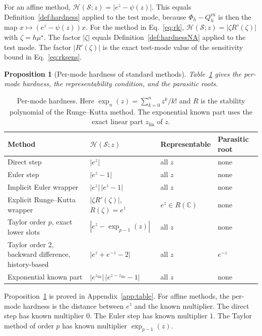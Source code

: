 \documentclass[11pt]{article}
\newtheorem{proposition}{Proposition}
\theoremstyle{definition}
\theoremstyle{remark}
\newcommand{\C}{\mathbb{C}}
\newcommand{\Meth}{\mathcal{S}}          %
\newcommand{\Hard}{\mathcal{H}}          %
\newcommand{\expt}[1]{\exp_{#1}}         %
\newcommand{\ex}{\mathrm{ex}}
\begin{document}
For an affine method, $\Hard(\Meth; z) = |e^z - \psi(z)|$.
This equals Definition~\ref{def:hardness} applied to the test mode, because $\Phi_h - Q^\ex_h$ is then the map $x \mapsto (e^z - \psi(z))x$.
For the method in Eq.~\eqref{eq:rk}, $\Hard(\Meth; z) = |\zeta R'(\zeta)|$ with $\zeta = h\mu^\star$.
The factor $|\zeta|$ equals Definition~\ref{def:hardnessNA} applied to the test mode.
The factor $|R'(\zeta)|$ is the exact test-mode value of the sensitivity bound in Eq.~\eqref{eq:rksens}.

\begin{proposition}[Per-mode hardness of standard methods]\label{prop:table}
Table~\ref{tab:permode} gives the per-mode hardness, the representability condition, and the parasitic roots.
\end{proposition}

\begin{table}[htbp]
\centering
\caption{Per-mode hardness. Here $\expt{n}(z) = \sum_{k=0}^n z^k/k!$ and $R$ is the stability polynomial of the Runge--Kutta method. The exponential known part uses the exact linear part $z_{\mathrm{lin}}$ of $z$.}\label{tab:permode}
\small
\begin{tabular}{@{}p{}p{}p{}p{}@{}}
\toprule
Method & $\Hard(\Meth; z)$ & Representable & Parasitic root \\
\midrule
Direct step & $|e^{z}|$ & all $z$ & none \\
Euler step & $|e^z - 1|$ & all $z$ & none \\
Implicit Euler wrapper & $|e^z|\,|e^z - 1|$ & all $z$ & none \\
Explicit Runge--Kutta wrapper & $|\zeta R'(\zeta)|$, $R(\zeta) = e^z$ & $e^z \in R(\C)$ & none \\
Taylor order $p$, exact lower slots & $|e^z - \expt{p-1}(z)|$ & all $z$ & none \\
Taylor order 2, backward difference, history-based & $|e^z + e^{-z} - 2|$ & all $z$ & $e^{-z}$ \\
Exponential known part & $|e^{z_{\mathrm{lin}}}|\,|e^{z - z_{\mathrm{lin}}} - 1|$ & all $z$ & none \\
\bottomrule
\end{tabular}
\end{table}

Proposition~\ref{prop:table} is proved in Appendix~\ref{app:table}.
For affine methods, the per-mode hardness is the distance between $e^z$ and the known multiplier.
The direct step has known multiplier $0$.
The Euler step has known multiplier $1$.
The Taylor method of order $p$ has known multiplier $\expt{p-1}(z)$.
\end{document}
